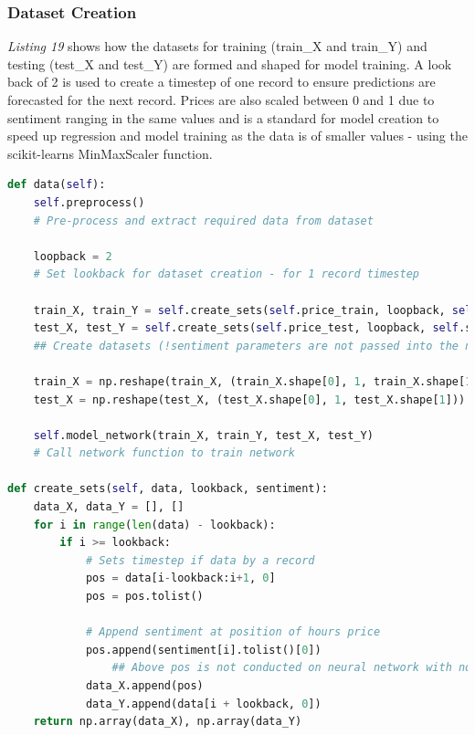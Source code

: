 \documentclass[oneside, 12pt]{article}
\begin{document}
		\subsubsection{Dataset Creation}
		
		\textit{Listing 19} shows how the datasets for training (train\_X and train\_Y) and testing (test\_X and test\_Y) are formed and shaped for model training. A look back of 2 is used to create a timestep of one record to ensure predictions are forecasted for the next record. Prices are also scaled between 0 and 1 due to sentiment ranging in the same values and is a standard for model creation to speed up regression and model training as the data is of smaller values - using the scikit-learns MinMaxScaler function.
		\newline
		
		\begin{lstlisting}[language=python, caption=Dataset creation and preprocessing]
def data(self):
	self.preprocess()
	# Pre-process and extract required data from dataset
	
	loopback = 2
	# Set lookback for dataset creation - for 1 record timestep
	
	train_X, train_Y = self.create_sets(self.price_train, loopback, self.sentiment_data[0:self.price_train_size])
	test_X, test_Y = self.create_sets(self.price_test, loopback, self.sentiment_data[self.price_train_size:len(self.scaledPrice)])
	## Create datasets (!sentiment parameters are not passed into the neural network the doesn't embedded the sentiment alongside price data!)
	
	train_X = np.reshape(train_X, (train_X.shape[0], 1, train_X.shape[1]))
	test_X = np.reshape(test_X, (test_X.shape[0], 1, test_X.shape[1]))
	
	self.model_network(train_X, train_Y, test_X, test_Y)
	# Call network function to train network

def create_sets(self, data, lookback, sentiment):
	data_X, data_Y = [], []
	for i in range(len(data) - lookback):
		if i >= lookback:
			# Sets timestep if data by a record
			pos = data[i-lookback:i+1, 0]
			pos = pos.tolist()

			# Append sentiment at position of hours price
			pos.append(sentiment[i].tolist()[0])
				## Above pos is not conducted on neural network with no sentiment embedded pos.append(0) occurs instead
			data_X.append(pos)
			data_Y.append(data[i + lookback, 0])
	return np.array(data_X), np.array(data_Y)
		\end{lstlisting}
		
\end{document}
